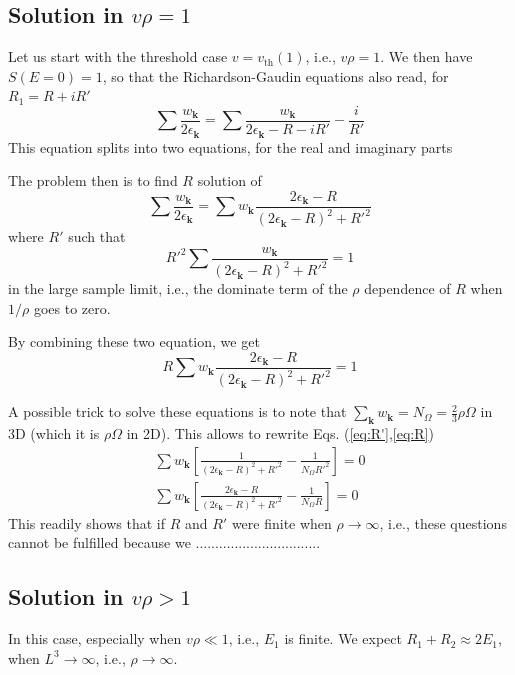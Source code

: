 \documentclass{article}
\newcommand{\vk}{\ensuremath{\mathbf{k}}}
\begin{document}
\subsection{Solution in $v\rho=1$}
Let us start with the threshold case $v=v_{\text{th}}(1)$, i.e., $v\rho=1$.  We then have $S(E=0)=1$, so that the Richardson-Gaudin equations also read, for $R_1=R+iR'$
\begin{equation}
\sum\frac{w_\vk}{2\epsilon_\vk}=\sum\frac{w_\vk}{2\epsilon_\vk-R-iR'}-\frac{i}{R'}
\label{eq:}
\end{equation}
This equation splits into two equations, for the real and imaginary parts

The problem then is to find $R$ solution of 
\begin{equation}
\sum\frac{w_\vk}{2\epsilon_\vk}=\sum{}w_\vk\frac{2\epsilon_\vk-R}{(2\epsilon_\vk-R)^2+R'^2}
\label{eq:}
\end{equation}
where $R'$ such that 
\begin{equation}
R'^2\sum{}\frac{w_\vk}{(2\epsilon_\vk-R)^2+R'^2}=1
\label{eq:R'}
\end{equation}
in the large sample limit, i.e., the dominate term of the $\rho$ dependence of $R$ when $1/\rho$ goes to zero. 

By combining these two equation, we get
\begin{equation}
R\sum{}w_\vk\frac{2\epsilon_\vk-R}{(2\epsilon_\vk-R)^2+R'^2}=1
\label{eq:R}
\end{equation}

A possible trick to solve these equations is to note that $\sum_\vk{}w_\vk=N_\Omega=\frac23\rho\Omega$ in 3D (which it is $\rho\Omega$ in 2D).  This allows to rewrite Eqs. (\ref{eq:R'},\ref{eq:R})
\begin{gather}
\sum{}w_\vk\left[\frac{1}{(2\epsilon_\vk-R)^2+R'^2}-\frac{1}{N_\Omega{}R'^2}\right]=0\\
\sum{}w_\vk\left[\frac{2\epsilon_\vk-R}{(2\epsilon_\vk-R)^2+R'^2}-\frac{1}{N_\Omega{}R}\right]=0
\end{gather}
This readily shows that if $R$ and $R'$ were finite when $\rho\rightarrow\infty$, i.e., these questions cannot be fulfilled because we 
................................


\subsection{Solution in $v\rho>1$}
In this case, especially when $v\rho\ll1$, i.e., $E_1$ is finite. We expect $R_1+R_2\approx2E_1$, when $L^3\rightarrow\infty$, i.e., $\rho\rightarrow\infty$.  
\end{document}

